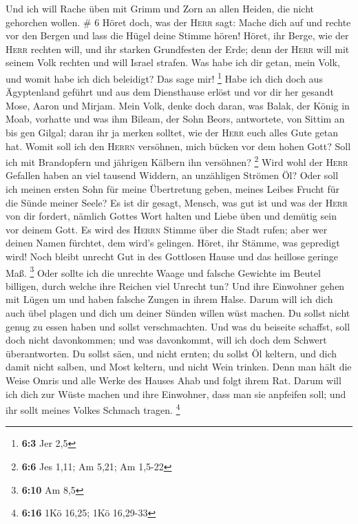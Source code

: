  Und ich will Rache üben mit Grimm und Zorn an allen
Heiden, die nicht gehorchen wollen. \# 6  Höret doch, was
der \textsc{Herr} sagt: Mache dich auf und rechte vor den Bergen und
lass die Hügel deine Stimme hören!  Höret, ihr Berge, wie
der \textsc{Herr} rechten will, und ihr starken Grundfesten der Erde;
denn der \textsc{Herr} will mit seinem Volk rechten und will Israel
strafen.  Was habe ich dir getan, mein Volk, und womit
habe ich dich beleidigt? Das sage mir! \footnote{\textbf{6:3} Jer 2,5}
 Habe ich dich doch aus Ägyptenland geführt und aus dem
Diensthause erlöst und vor dir her gesandt Mose, Aaron und Mirjam.
 Mein Volk, denke doch daran, was Balak, der König in
Moab, vorhatte und was ihm Bileam, der Sohn Beors, antwortete, von
Sittim an bis gen Gilgal; daran ihr ja merken solltet, wie der
\textsc{Herr} euch alles Gute getan hat.  Womit soll ich
den \textsc{Herrn} versöhnen, mich bücken vor dem hohen Gott? Soll ich
mit Brandopfern und jährigen Kälbern ihn versöhnen? \footnote{\textbf{6:6}
  Jes 1,11; Am 5,21; Am 1,5-22}  Wird wohl der
\textsc{Herr} Gefallen haben an viel tausend Widdern, an unzähligen
Strömen Öl? Oder soll ich meinen ersten Sohn für meine Übertretung
geben, meines Leibes Frucht für die Sünde meiner Seele? 
Es ist dir gesagt, Mensch, was gut ist und was der \textsc{Herr} von dir
fordert, nämlich Gottes Wort halten und Liebe üben und demütig sein vor
deinem Gott.  Es wird des \textsc{Herrn} Stimme über die
Stadt rufen; aber wer deinen Namen fürchtet, dem wird's gelingen. Höret,
ihr Stämme, was gepredigt wird!  Noch bleibt unrecht Gut
in des Gottlosen Hause und das heillose geringe Maß. \footnote{\textbf{6:10}
  Am 8,5}  Oder sollte ich die unrechte Waage und falsche
Gewichte im Beutel billigen,  durch welche ihre Reichen
viel Unrecht tun? Und ihre Einwohner gehen mit Lügen um und haben
falsche Zungen in ihrem Halse.  Darum will ich dich auch
übel plagen und dich um deiner Sünden willen wüst machen.
 Du sollst nicht genug zu essen haben und sollst
verschmachten. Und was du beiseite schaffst, soll doch nicht
davonkommen; und was davonkommt, will ich doch dem Schwert
überantworten.  Du sollst säen, und nicht ernten; du
sollst Öl keltern, und dich damit nicht salben, und Most keltern, und
nicht Wein trinken.  Denn man hält die Weise Omris und
alle Werke des Hauses Ahab und folgt ihrem Rat. Darum will ich dich zur
Wüste machen und ihre Einwohner, dass man sie anpfeifen soll; und ihr
sollt meines Volkes Schmach tragen. \footnote{\textbf{6:16} 1Kö 16,25;
  1Kö 16,29-33}


